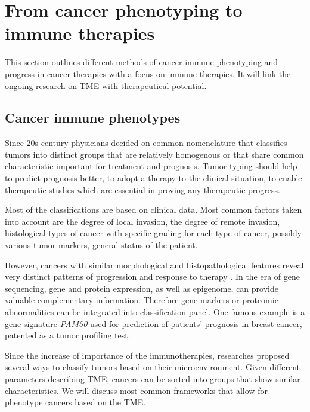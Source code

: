 \documentclass[12pt,]{book}
\theoremstyle{definition}
\theoremstyle{definition}
\theoremstyle{definition}
\theoremstyle{remark}
\begin{document}
\hypertarget{immunotherapies}{%
\section{From cancer phenotyping to immune
therapies}\label{immunotherapies}}

This section outlines different methods of cancer immune phenotyping and
progress in cancer therapies with a focus on immune therapies. It will
link the ongoing research on TME with therapeutical potential.

\hypertarget{cancer-immune-phenotypes}{%
\subsection{Cancer immune phenotypes}\label{cancer-immune-phenotypes}}

Since 20s century physicians decided on common nomenclature that
classifies tumors into distinct groups that are relatively homogenous or
that share common characteristic important for treatment and prognosis.
Tumor typing should help to predict prognosis better, to adopt a therapy
to the clinical situation, to enable therapeutic studies which are
essential in proving any therapeutic progress.

Most of the classifications are based on clinical data. Most common
factors taken into account are the degree of local invasion, the degree
of remote invasion, histological types of cancer with specific grading
for each type of cancer, possibly various tumor markers, general status
of the patient.

However, cancers with similar morphological and histopathological
features reveal very distinct patterns of progression and response to
therapy \citep{Galon2014}. In the era of gene sequencing, gene and
protein expression, as well as epigenome, can provide valuable
complementary information. Therefore gene markers or proteomic
abnormalities can be integrated into classification panel. One famous
example is a gene signature \emph{PAM50} \citep{Parker2009} used for
prediction of patients' prognosis in breast cancer, patented as a tumor
profiling test.

Since the increase of importance of the immunotherapies, researches
proposed several ways to classify tumors based on their
microenvironment. Given different parameters describing TME, cancers can
be sorted into groups that show similar characteristics. We will discuss
most common frameworks that allow for phenotype cancers based on the
TME.
\end{document}
